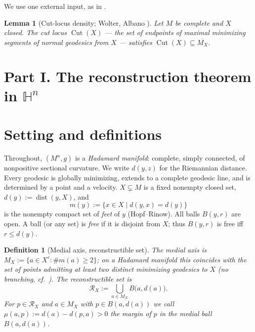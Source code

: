 \documentclass[11pt]{article}
\newtheorem{lemma}[theorem]{Lemma}
\newtheorem{definition}[theorem]{Definition}
\theoremstyle{remark}
\newcommand{\X}{X}
\newcommand{\Mx}{M_{\X}}
\newcommand{\Rx}{\mathcal{R}_{\X}}
\newcommand{\dist}{\operatorname{dist}}
\newcommand{\Cut}{\operatorname{Cut}}
\newcommand{\B}{B}
\begin{document}
We use one external input, as in \cite{R1}.

\begin{lemma}[Cut-locus density; Wolter, Albano \cite{Wol,Alb}]
\label{lem:cut}
Let $M$ be complete and $\X$ closed. The cut locus $\Cut(\X)$ --- the
set of endpoints of maximal minimizing segments of normal geodesics
from $\X$ --- satisfies $\Cut(\X)\subseteq\overline{\Mx}$.
\end{lemma}

\section*{Part I. The reconstruction theorem in $\mathbb{H}^{n}$}

\section{Setting and definitions}\label{sec:setting}

Throughout, $(M^{n},g)$ is a \emph{Hadamard manifold}: complete,
simply connected, of nonpositive sectional curvature. We write
$d(y,z)$ for the Riemannian distance. Every geodesic is globally
minimizing, extends to a complete geodesic line, and is determined by
a point and a velocity. $\X\subsetneq M$ is a fixed nonempty closed
set, $d(y):=\dist(y,\X)$, and
\[
m(y):=\{x\in\X \mid d(y,x)=d(y)\}
\]
is the nonempty compact set of \emph{feet} of $y$ (Hopf--Rinow). All
balls $\B(y,r)$ are open. A ball (or any set) is \emph{free} if it is
disjoint from $\X$; thus $\B(y,r)$ is free iff $r\le d(y)$.

\begin{definition}[Medial axis, reconstructible set]\label{def:medial}
The \emph{medial axis} is
$\Mx:=\{a\in\X^{c} : \#m(a)\ge 2\}$; on a Hadamard manifold this
coincides with the set of points admitting at least two distinct
minimizing geodesics to $\X$ (no branching, cf.\
\cite[Rem.~2.2]{R1}). The \emph{reconstructible set} is
\[
\Rx:=\bigcup_{a\in\Mx}\B\bigl(a,d(a)\bigr).
\]
For $p\in\Rx$ and $a\in\Mx$ with $p\in\B(a,d(a))$ we call
$\mu(a,p):=d(a)-d(p,a)>0$ the \emph{margin} of $p$ in the medial ball
$\B(a,d(a))$.
\end{definition}
\end{document}
